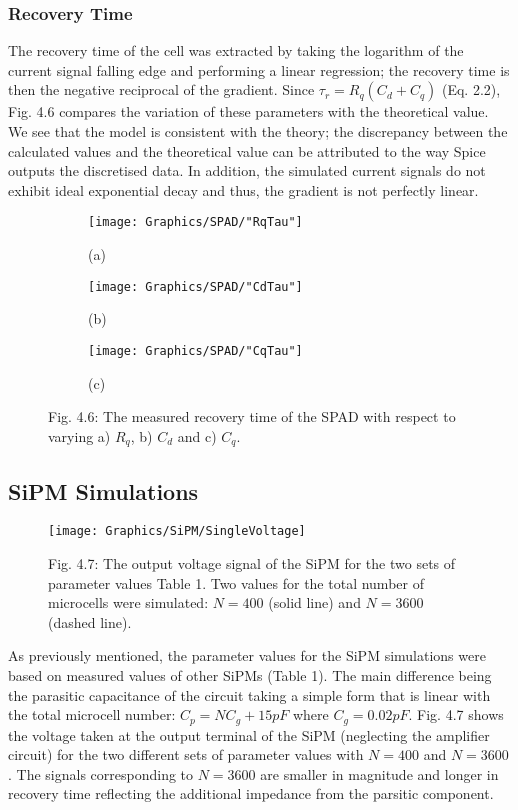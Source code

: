 \subsubsection{Recovery Time}

The recovery time of the cell was extracted by taking the logarithm of the current signal falling edge and performing a linear regression; the recovery time is then the negative reciprocal of the gradient. Since $\tau_r = R_q(C_d+C_q)$ (Eq. 2.2), Fig. 4.6 compares the variation of these parameters with the theoretical value. We see that the model is consistent with the theory; the discrepancy between the calculated values and the theoretical value can be attributed to the way Spice outputs the discretised data. In addition, the simulated current signals do not exhibit ideal exponential decay and thus, the gradient is not perfectly linear.

\begin{figure}[h]
  \centering
  \begin{subfigure}
    \centering
    \texttt{[image: Graphics/SPAD/"RqTau"]}
    \caption*{(a)}
  \end{subfigure}
  \begin{subfigure}
    \centering
    \texttt{[image: Graphics/SPAD/"CdTau"]}
    \caption*{(b)}
  \end{subfigure}
  \begin{subfigure}
    \centering
    \texttt{[image: Graphics/SPAD/"CqTau"]}
    \caption*{(c)}
  \end{subfigure}
  {\caption*{Fig. 4.6: The measured recovery time of the SPAD with respect to varying a) $R_q$, b) $C_d$ and c) $C_q$.}}
\end{figure}

\subsection{SiPM Simulations}

\begin{figure}[h]
  \centering
  \texttt{[image: Graphics/SiPM/SingleVoltage]}
  {\caption*{Fig. 4.7: The output voltage signal of the SiPM for the two sets of parameter values Table 1. Two values for the total number of microcells were simulated: $N=400$ (solid line) and $N=3600$ (dashed line).}}
\end{figure}

As previously mentioned, the parameter values for the SiPM simulations were based on measured values of other SiPMs (Table 1). The main difference being the parasitic capacitance of the circuit taking a simple form that is linear with the total microcell number: $C_p=NC_g+15pF$ where $C_g=0.02pF$. Fig. 4.7 shows the voltage taken at the output terminal of the SiPM (neglecting the amplifier circuit) for the two different sets of parameter values with $N=400$ and $N=3600$. The signals corresponding to $N=3600$ are smaller in magnitude and longer in recovery time reflecting the additional impedance from the parsitic component.

